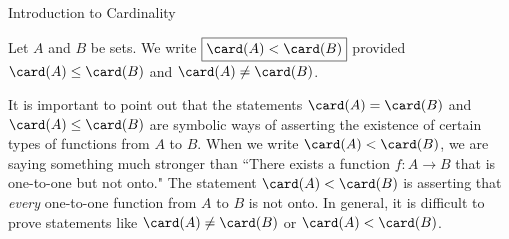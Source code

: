 \begin{section}{Introduction to Cardinality}
\begin{definition}
Let $A$ and $B$ be sets. We write $\boxed{\card(A)< \card(B)}$ provided $\card(A)\leq \card(B)$ and $\card(A)\neq \card(B)$.
\end{definition}

It is important to point out that the statements $\card(A)= \card(B)$ and $\card(A)\leq \card(B)$ are symbolic ways of asserting the existence of certain types of functions from $A$ to $B$. When we write $\card(A)<\card(B)$, we are saying something much stronger than ``There exists a function $f:A\to B$ that is one-to-one but not onto." The statement $\card(A)<\card(B)$ is asserting that \emph{every} one-to-one function from $A$ to $B$ is not onto. In general, it is difficult to prove statements like $\card(A)\neq \card(B)$ or $\card(A)<\card(B)$.




\end{section}